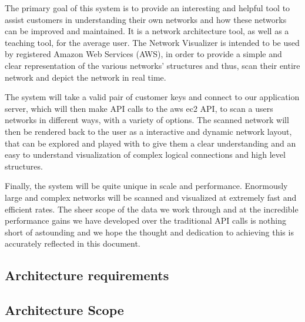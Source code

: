 \documentclass[hidelinks,a4paper,12pt]{article}
\begin{document}
The primary goal of this system is to provide an interesting and helpful tool to assist customers in understanding their own networks and how these networks can be improved and maintained. 
It is a network architecture tool, as well as a teaching tool, for the average user. The Network Visualizer is intended to be used by registered Amazon Web Services (AWS), in order to provide a simple and clear representation of the various networks' structures and thus, scan their entire network and depict the network in real time.

The system will take a valid pair of customer keys and connect to our application server, which will then make API calls to the aws ec2 API, to scan a users networks in different ways, with a variety of options. The scanned network will then be rendered back to the user as a interactive and dynamic network layout, that can be explored and played with to give them a clear understanding and an easy to understand visualization of complex logical connections and high level structures.

Finally, the system will be quite unique in scale and performance. Enormously large and complex networks will be scanned and visualized at extremely fast and efficient rates. The sheer scope of the data we work through and at the incredible performance gains we have developed over the traditional API calls is nothing short of astounding and we hope the thought and dedication to achieving this is accurately reflected in this document.

\newpage
\subsection{Architecture requirements}


\subsection{Architecture Scope}
\end{document}
